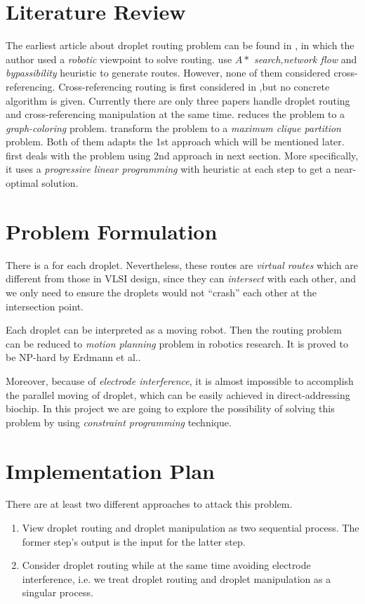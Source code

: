 \documentclass[a4paper,12pt]{article}
\begin{document}
\section{Literature Review}
The earliest article about droplet routing problem can be found in \cite{bohringer2003osm},
in which the author used a \textit{robotic} viewpoint to solve routing.
\cite{bohringer2006mac}\cite{1326232}\cite{1353672} use \textit{$A*$ search,network flow} and \textit{bypassibility} heuristic to generate routes.
However, none of them considered cross-referencing.
Cross-referencing routing is first considered in \cite{bohringer2003osm},but no concrete algorithm is given.
Currently there are only three papers handle droplet routing and cross-referencing manipulation at the same time.
\cite{griffith2006pcr} reduces the problem to a \textit{graph-coloring} problem.
\cite{1266484} transform the problem to a \textit{maximum clique partition} problem.
Both of them adapts the 1st approach which will be mentioned later.
\cite{yuh2008pib} first deals with the problem using 2nd approach in next section.
More specifically, it uses a \textit{progressive linear programming} with heuristic at each step to get a near-optimal solution.

\section{Problem Formulation}
There is a  for each droplet. Nevertheless,
these routes are \textit{virtual routes} which are different from those in VLSI design,
since they can \textit{intersect} with each other,
and we only need to ensure the droplets would not ``crash'' each other at the intersection point.

Each droplet can be interpreted as a moving robot.
Then the routing problem can be reduced to \textit{motion planning} problem in robotics research.
It is proved to be NP-hard by Erdmann et al.\cite{erdmannmovingobj}.

Moreover, because of \textit{electrode interference},
it is almost impossible to accomplish the parallel moving of droplet, which can be easily achieved in direct-addressing biochip.
In this project we are going to explore the possibility of solving this problem by using \textit{constraint programming} technique.

\section{Implementation Plan}
There are at least two different approaches to attack this problem.
\begin{enumerate}
  \item View droplet routing and droplet manipulation as two sequential process.
  The former step's output is the input for the latter step.
  \item Consider droplet routing while at the same time avoiding electrode interference, i.e.
  we treat droplet routing and droplet manipulation as a singular process.
\end{enumerate}
\end{document}
